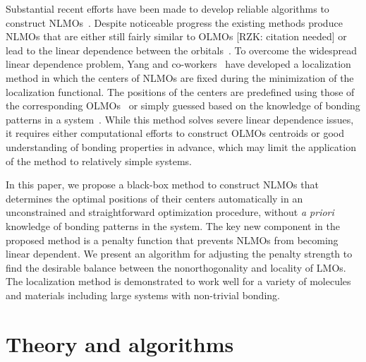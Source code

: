 \documentclass[aps,prl,reprint,amsmath,amssymb]{revtex4-1}
\begin{document}
Substantial recent efforts have been made to develop reliable algorithms to construct NLMOs~\cite{feng2004An_efficient, liu2000nonorthogonal, peng2013effective, hoyvik2017generalising}. %
%
Despite noticeable progress the existing methods produce NLMOs that are either still fairly similar to OLMOs [RZK: citation needed] or lead to the linear dependence between the orbitals~\cite{feng2004An_efficient}. 
To overcome the widespread linear dependence problem, Yang and co-workers~\cite{feng2004An_efficient, cui2010efficient} have developed a localization method in which the centers of NLMOs are fixed during the minimization of the localization functional. 
The positions of the centers are predefined using those of the corresponding OLMOs~\cite{feng2004An_efficient} or simply guessed based on the knowledge of bonding patterns in a system~\cite{cui2010efficient}. %
While this method solves severe linear dependence issues, it requires either computational efforts to construct OLMOs centroids or good understanding of bonding properties in advance, which may limit the application of the method to relatively simple systems.

In this paper, we propose a black-box method to construct NLMOs that determines the optimal positions of their centers automatically in an unconstrained and straightforward optimization procedure, without \emph{a priori} knowledge of bonding patterns in the system. 
The key new component in the proposed method is a penalty function that prevents NLMOs from becoming linear dependent.  
We present an algorithm for adjusting the penalty strength to find the desirable balance between the nonorthogonality and locality of LMOs. 
The localization method is demonstrated to work well for a variety of molecules and materials including large systems with non-trivial bonding. 

\section{Theory and algorithms}
\end{document}
